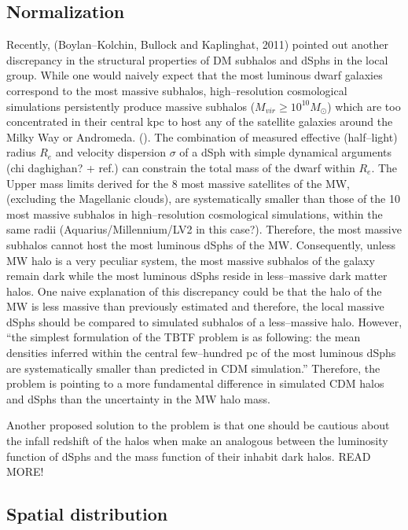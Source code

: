 \documentclass[paper=a4, fontsize=11pt]{scrartcl} %
\numberwithin{equation}{section} %
\numberwithin{figure}{section} %
\numberwithin{table}{section} %
\begin{document}
\subsection{Normalization}
Recently, (Boylan--Kolchin, Bullock and Kaplinghat, 2011) pointed out another discrepancy in the structural properties of DM subhalos and dSphs in the local group. While one would naively expect that the most luminous dwarf galaxies correspond to the most massive subhalos, high--resolution cosmological simulations persistently produce massive subhalos ($M_{vir} \geq 10^{10} M_\odot$) which are too concentrated in their central kpc to host any of the satellite galaxies around the Milky Way or Andromeda. (\cite{Boylan--Kolchin11}). The combination of measured effective (half--light) radius $R_e$ and velocity dispersion $\sigma$ of a dSph with simple dynamical arguments (chi daghighan? + ref.) can constrain the total mass of the dwarf within $R_e$. The Upper mass limits derived for the 8 most massive satellites of the MW, (excluding the Magellanic clouds), are systematically smaller than those of the 10 most massive subhalos in high--resolution cosmological simulations, within the same radii (Aquarius/Millennium/LV2 in this case?). Therefore, the most massive subhalos cannot host the most luminous dSphs of the MW. Consequently, unless MW halo is a very peculiar system, the most massive subhalos of the galaxy remain dark while the most luminous dSphs reside in less--massive dark matter halos. One naive explanation of this discrepancy could be that the halo of the MW is less massive than previously estimated and therefore, the local massive dSphs should be compared to simulated subhalos of a less--massive halo. However, ``the simplest formulation of the TBTF problem is as following: the mean densities inferred within the central few--hundred pc of the most luminous dSphs are systematically smaller than predicted in CDM simulation.'' Therefore, the problem is pointing to a more fundamental difference in simulated CDM halos and dSphs than the uncertainty in the MW halo mass.

Another proposed solution to the problem is that one should be cautious about the infall redshift of the halos when make an analogous between the luminosity function of dSphs and the mass function of their inhabit dark halos. READ MORE!

\subsection{Spatial distribution}
\end{document}
